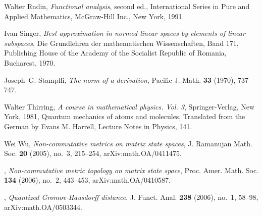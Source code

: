 \documentclass[12pt]{amsart}
\newcommand{\<}{\langle}
\renewcommand{\>}{\rangle}
\theoremstyle{definition}   %
\begin{document}
\begin{thebibliography}{99}
Walter Rudin, \emph{Functional analysis}, second ed., International Series in
  Pure and Applied Mathematics, McGraw-Hill Inc., New York, 1991. 

Ivan Singer, \emph{Best approximation in normed linear spaces by elements of
  linear subspaces}, Die
  Grundlehren der mathematischen Wissenschaften, Band 171, Publishing House of
  the Academy of the Socialist Republic of Romania, Bucharest, 1970.

Joseph~G. Stampfli, \emph{The norm of a derivation}, Pacific J. Math.
  \textbf{33} (1970), 737--747. 

Walter Thirring, \emph{A course in mathematical physics. {V}ol. 3},
  Springer-Verlag, New York, 1981, Quantum mechanics of atoms and molecules,
  Translated from the German by Evans M. Harrell, Lecture Notes in Physics,
  141. 

Wei Wu, \emph{Non-commutative metrics on matrix state spaces}, J. Ramanujan
 Math. Soc. \textbf{20} (2005), no.~3, 215--254, arXiv:math.OA/0411475.

\bysame, \emph{Non-commutative metric topology on matrix state space}, Proc. Amer. Math. Soc. \textbf{134} (2006), no.~2, 443--453, arXiv:math.OA/0410587.

\bysame, \emph{Quantized {G}romov-{H}ausdorff distance}, J. Funct. Anal.
  \textbf{238} (2006), no.~1, 58--98, arXiv:math.OA/0503344. 

\end{thebibliography}


%
%

%
%
\end{document}
